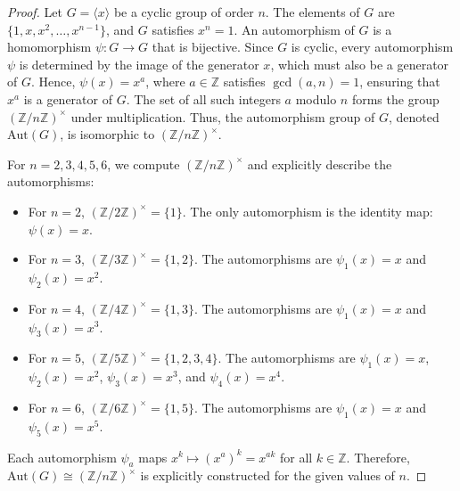 \documentclass{article}
\begin{document}
\begin{proof}
    Let \( G = \langle x \rangle \) be a cyclic group of order \( n \). The elements of \( G \) are \(\{1, x, x^2, \dots, x^{n-1}\}\), and \( G \) satisfies \( x^n = 1 \). An automorphism of \( G \) is a homomorphism \( \psi: G \to G \) that is bijective. Since \( G \) is cyclic, every automorphism \( \psi \) is determined by the image of the generator \( x \), which must also be a generator of \( G \). Hence, \( \psi(x) = x^a \), where \( a \in \mathbb{Z} \) satisfies \(\gcd(a, n) = 1\), ensuring that \( x^a \) is a generator of \( G \). The set of all such integers \( a \) modulo \( n \) forms the group \((\mathbb{Z}/n\mathbb{Z})^\times\) under multiplication. Thus, the automorphism group of \( G \), denoted \(\text{Aut}(G)\), is isomorphic to \((\mathbb{Z}/n\mathbb{Z})^\times\).  

For \( n = 2, 3, 4, 5, 6 \), we compute \((\mathbb{Z}/n\mathbb{Z})^\times\) and explicitly describe the automorphisms:
\begin{itemize}
    \item For \( n = 2 \), \((\mathbb{Z}/2\mathbb{Z})^\times = \{1\}\). The only automorphism is the identity map: \( \psi(x) = x \).
    \item For \( n = 3 \), \((\mathbb{Z}/3\mathbb{Z})^\times = \{1, 2\}\). The automorphisms are \( \psi_1(x) = x \) and \( \psi_2(x) = x^2 \).
    \item For \( n = 4 \), \((\mathbb{Z}/4\mathbb{Z})^\times = \{1, 3\}\). The automorphisms are \( \psi_1(x) = x \) and \( \psi_3(x) = x^3 \).
    \item For \( n = 5 \), \((\mathbb{Z}/5\mathbb{Z})^\times = \{1, 2, 3, 4\}\). The automorphisms are \( \psi_1(x) = x \), \( \psi_2(x) = x^2 \), \( \psi_3(x) = x^3 \), and \( \psi_4(x) = x^4 \).
    \item For \( n = 6 \), \((\mathbb{Z}/6\mathbb{Z})^\times = \{1, 5\}\). The automorphisms are \( \psi_1(x) = x \) and \( \psi_5(x) = x^5 \).
\end{itemize}

Each automorphism \( \psi_a \) maps \( x^k \mapsto (x^a)^k = x^{ak} \) for all \( k \in \mathbb{Z} \). Therefore, \(\text{Aut}(G) \cong (\mathbb{Z}/n\mathbb{Z})^\times\) is explicitly constructed for the given values of \( n \). 
\end{proof}
\end{document}

